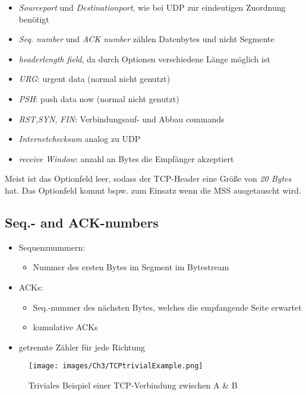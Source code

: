 \begin{itemize}
    \item \emph{Sourceport} und \emph{Destinationport}, wie bei UDP zur eindeutigen Zuordnung benötigt
    \item \emph{Seq. number} und \emph{ACK number} zählen Datenbytes und nicht Segmente
    \item \emph{headerlength field}, da durch Optionen verschiedene Länge möglich ist
    \item \emph{URG}: urgent data (normal nicht genutzt)
    \item \emph{PSH}: push data now (normal nicht genutzt)
    \item \emph{RST},\emph{SYN}, \emph{FIN}: Verbindungsauf- und Abbau commands
    \item \emph{Internetchecksum} analog zu UDP
    \item \emph{receive Window}: anzahl an Bytes die Empfänger akzeptiert
\end{itemize}
Meist ist das Optionfeld leer, sodass der TCP-Header eine Größe von \emph{20 Bytes} hat. Das Optionfeld kommt bspw. zum Einsatz wenn die MSS ausgetauscht wird.\\

\subsection{Seq.- and ACK-numbers}
\begin{itemize}
    \item Sequenznummern:
            \begin{itemize}
                \item Nummer des ersten Bytes im Segment im Bytestream
            \end{itemize}
    \item ACKs:
            \begin{itemize}
                \item Seq.-nummer des nächsten Bytes, welches die empfangende Seite erwartet
                \item kumulative ACKs
            \end{itemize}
    \item getrennte Zähler für jede Richtung        
\end{itemize}

\begin{figure}[H]
    \centering
    \texttt{[image: images/Ch3/TCPtrivialExample.png]}
    \caption{Triviales Beispiel einer TCP-Verbindung zwischen A \& B}
    \label{Ch03-TCP-trivialExample}
\end{figure}

